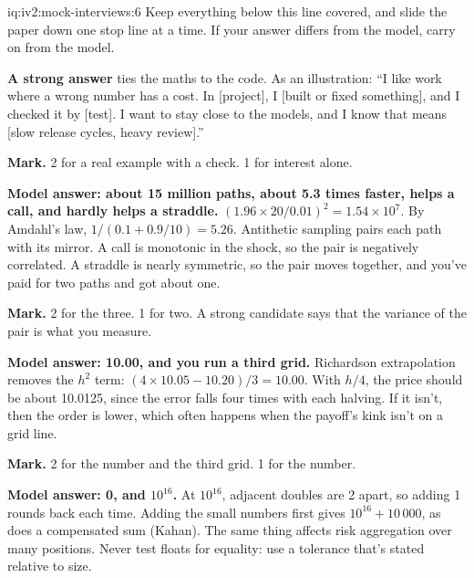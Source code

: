 \begin{solution}{iq:iv2:mock-interviews:6}
Keep everything below this line covered, and slide the paper down one stop line at a time. If your answer differs from the model, carry on from the model.

\ivstop
\textbf{A strong answer} ties the maths to the code. As an illustration: ``I like work where a wrong number has a cost. In [project], I [built or fixed something], and I checked it by [test]. I want to stay close to the models, and I know that means [slow release cycles, heavy review].''

\textbf{Mark.} 2 for a real example with a check. 1 for interest alone.

\ivstop
\textbf{Model answer: about 15 million paths, about 5.3 times faster, helps a call, and hardly helps a straddle.} $(1.96 \times 20/0.01)^2 = 1.54 \times 10^7$. By Amdahl's law, $1/(0.1 + 0.9/10) = 5.26$. Antithetic sampling pairs each path with its mirror. A call is monotonic in the shock, so the pair is negatively correlated. A straddle is nearly symmetric, so the pair moves together, and you've paid for two paths and got about one.

\textbf{Mark.} 2 for the three. 1 for two. A strong candidate says that the variance of the pair is what you measure.

\ivstop
\textbf{Model answer: 10.00, and you run a third grid.} Richardson extrapolation removes the $h^2$ term: $(4 \times 10.05 - 10.20)/3 = 10.00$. With $h/4$, the price should be about 10.0125, since the error falls four times with each halving. If it isn't, then the order is lower, which often happens when the payoff's kink isn't on a grid line.

\textbf{Mark.} 2 for the number and the third grid. 1 for the number.

\ivstop
\textbf{Model answer: 0, and $10^{16}$.} At $10^{16}$, adjacent doubles are 2 apart, so adding 1 rounds back each time. Adding the small numbers first gives $10^{16} + 10\,000$, as does a compensated sum (Kahan). The same thing affects risk aggregation over many positions. Never test floats for equality: use a tolerance that's stated relative to size.


\end{solution}
